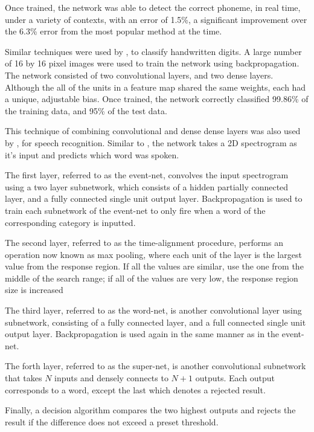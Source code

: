 Once trained, the network was able to detect the correct phoneme, in real time,
under a variety of contexts, with an error of 1.5\%, a significant improvement
over the 6.3\% error from the most popular method at the time.



Similar techniques were used by \cite{LeCun:1989:Backpropagation}, to classify
handwritten digits.
A large number of 16 by 16 pixel images were used to train the network using
backpropagation.
The network consisted of two convolutional layers, and two dense layers.
Although the all of the units in a feature map shared the same weights, each
had a unique, adjustable bias.
Once trained, the network correctly classified 99.86\% of the training data, and
95\% of the test data.



This technique of combining convolutional and dense dense layers was also used
by \cite{Yamaguchi:1990:Neural}, for speech recognition.
Similar to \citeauthor{Waibel:1989:Phoneme}, the network takes a 2D spectrogram
as it's input and predicts which word was spoken.

The first layer, referred to as the event-net, convolves the input spectrogram
using a two layer subnetwork, which consists of a hidden partially connected
layer, and a fully connected single unit output layer.
Backpropagation is used to train each subnetwork of the event-net to only fire
when a word of the corresponding category is inputted.

The second layer, referred to as the time-alignment procedure, performs an
operation now known as max pooling, where each unit of the layer is the largest
value from the response region. If all the values are similar, use the one from
the middle of the search range; if all of the values are very low, the response
region size is increased

The third layer, referred to as the word-net, is another convolutional layer
using subnetwork, consisting of a fully connected layer, and a full connected
single unit output layer.
Backpropagation is used again in the same manner as in the event-net.

The forth layer, referred to as the super-net, is another convolutional
subnetwork that takes $N$ inputs and densely connects to $N+1$ outputs.
Each output corresponds to a word, except the last which denotes a rejected
result.

Finally, a decision algorithm compares the two highest outputs and rejects the
result if the difference does not exceed a preset threshold.



